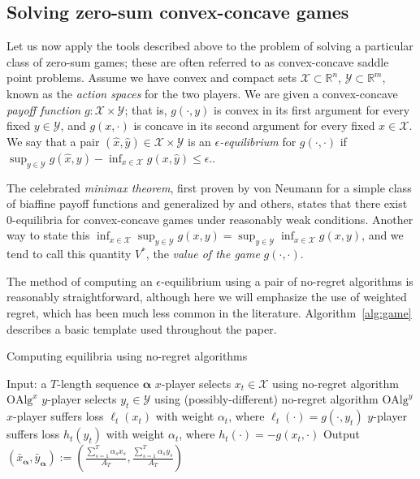 \documentclass[pmlr]{jmlr} %
\def\reals{\mathbb{R}}
\def\g{\gamma_{\K}}
\def\reals{\mathbb{R}}
\def\K{\mathcal{K}}
\def\balpha{\boldsymbol{\alpha}}
\def\alg{\text{OAlg}}
\newcommand{\XX}{\mathcal{X}}
\newcommand{\YY}{\mathcal{Y}}
\begin{document}




\subsection{Solving zero-sum convex-concave games}

Let us now apply the tools described above to the problem of solving a particular class of zero-sum games; these are often referred to as convex-concave saddle point problems. Assume we have convex and compact sets $\XX \subset \reals^{n}$, $\YY \subset \reals^{m}$, known as the \emph{action spaces} for the two players. We are given a convex-concave \emph{payoff function} $g: \XX \times \YY$; that is, $g(\cdot, y)$ is convex in its first argument for every fixed $y \in \YY$, and $g(x,\cdot)$ is concave in its second argument for every fixed $x \in \XX$. We say that a pair $(\hat x, \hat y) \in \XX\times \YY$ is an \emph{$\epsilon$-equilibrium} for $g(\cdot, \cdot)$ if $\sup_{y \in \YY} g(\hat x, y) - \inf_{x \in \XX} g(x, \hat y) \leq \epsilon.$.

The celebrated \emph{minimax theorem}, first proven by von Neumann for a simple class of biaffine payoff functions \citep{v1928theorie,neumann1944theory} and generalized by \citet{sion1958general} and others, states that there exist 0-equilibria for convex-concave games under reasonably weak conditions. Another way to state this $\inf_{x \in \XX} \sup_{y \in \YY} g(x, y) =  \sup_{y \in \YY}\inf_{x \in \XX} g(x, y)$, and we tend to call this quantity $V^{*}$, the \emph{value of the game} $g(\cdot, \cdot)$.

The method of computing an $\epsilon$-equilibrium using a pair of no-regret algorithms is reasonably straightforward, although here we will emphasize the use of weighted regret, which has been much less common in the literature. Algorithm~\ref{alg:game} describes a basic template used throughout the paper. 
\begin{algorithm}[h] 
   \caption{ Computing equilibria using no-regret algorithms } \label{alg:game}
\begin{algorithmic}[1]
\STATE Input: a $T$-length sequence $\balpha$
\STATE $x$-player selects $x_{t} \in \XX$ using no-regret algorithm $\alg^{x}$
\STATE $y$-player selects $y_{t}\in \YY$ using (possibly-different) no-regret algorithm $\alg^{y}$
\STATE $x$-player suffers loss $\ell_{t}(x_{t})$ with weight $\alpha_{t}$, where $\ell_{t}(\cdot) = g(\cdot,y_{t})$
\STATE $y$-player suffers loss $h_{t}(y_{t})$ with weight $\alpha_{t}$, where $h_{t}(\cdot) = -g(x_{t},\cdot)$
\ENDFOR
\STATE Output $(\bar{x}_{\balpha},\bar{y}_{\balpha}) := \left(\frac{ \sum_{s=1}^{T} \alpha_{s} x_{s}  }{ A_{T} }, \frac{ \sum_{s=1}^{T} \alpha_{s} y_{s}  }{ A_{T} }\right)$
\end{algorithmic}
\end{algorithm}
\end{document}
